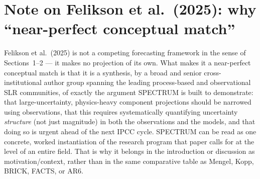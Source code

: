 \documentclass[11pt]{article}
\begin{document}
\section{Note on Felikson et al.\ (2025): why ``near-perfect conceptual match''}

Felikson et al.\ (2025) is not a competing forecasting framework in the
sense of Sections~1--2 --- it makes no projection of its own. What makes it
a near-perfect conceptual match is that it is a synthesis, by a broad and
senior cross-institutional author group spanning the leading process-based
and observational SLR communities, of exactly the argument SPECTRUM is
built to demonstrate: that large-uncertainty, physics-heavy component
projections should be narrowed using observations, that this requires
systematically quantifying uncertainty \emph{structure} (not just
magnitude) in both the observations and the models, and that doing so is
urgent ahead of the next IPCC cycle. SPECTRUM can be read as one concrete,
worked instantiation of the research program that paper calls for at the
level of an entire field. That is why it belongs in the introduction or
discussion as motivation/context, rather than in the same comparative table
as Mengel, Kopp, BRICK, FACTS, or AR6.
\end{document}
